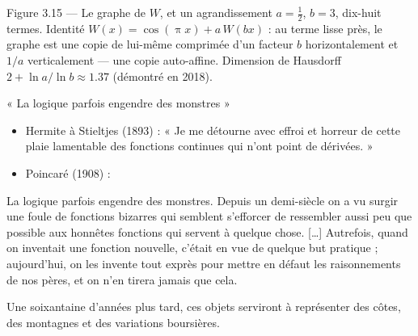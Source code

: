 \begin{frame}{Figure 3.15 --- Le graphe de $W$, et un agrandissement}
  \small $a=\tfrac12$, $b=3$, dix-huit termes. Identité
  $W(x)=\cos(\uppi x)+a\,W(bx)$ : au terme lisse près, le graphe est une
  copie de lui-même comprimée d'un facteur $b$ horizontalement et $1/a$
  verticalement --- une copie auto-affine. Dimension de Hausdorff
  $2+\ln a/\ln b\approx\num{1.37}$ (démontré en 2018).
\end{frame}

\begin{frame}{« La logique parfois engendre des monstres »}
  \small
  \begin{itemize}
    \item Hermite à Stieltjes (1893) : « Je me détourne avec effroi et
      horreur de cette plaie lamentable des fonctions continues qui n'ont
      point de dérivées. »
    \item Poincaré (1908) :
  \end{itemize}
  \begin{tcolorbox}[boxrem]
    \footnotesize La logique parfois engendre des monstres. Depuis un
    demi-siècle on a vu surgir une foule de fonctions bizarres qui
    semblent s'efforcer de ressembler aussi peu que possible aux
    honnêtes fonctions qui servent à quelque chose. […] Autrefois, quand
    on inventait une fonction nouvelle, c'était en vue de quelque but
    pratique ; aujourd'hui, on les invente tout exprès pour mettre en
    défaut les raisonnements de nos pères, et on n'en tirera jamais que
    cela.
  \end{tcolorbox}
  \small Une soixantaine d'années plus tard, ces objets serviront à
  représenter des côtes, des montagnes et des variations boursières.
\end{frame}

